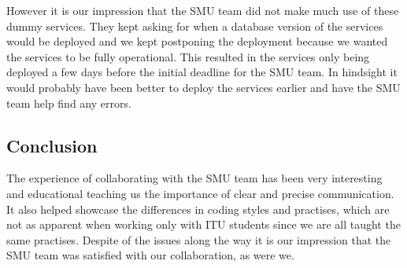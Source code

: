 \documentclass[../report.tex]{subfiles}
\begin{document}
However it is our impression that the SMU team did not make much use of these dummy services.
They kept asking for when a database version of the services would be deployed and we kept postponing the deployment because we wanted the services to be fully operational.
This resulted in the services only being deployed a few days before the initial deadline for the SMU team.
In hindsight it would probably have been better to deploy the services earlier and have the SMU team help find any errors.

\subsection{Conclusion}
The experience of collaborating with the SMU team has been very interesting and educational teaching us the importance of clear and precise communication.
It also helped showcase the differences in coding styles and practises, which are not as apparent when working only with ITU students since we are all taught the same practises. 
Despite of the issues along the way it is our impression that the SMU team was satisfied with our collaboration, as were we.
\end{document}
